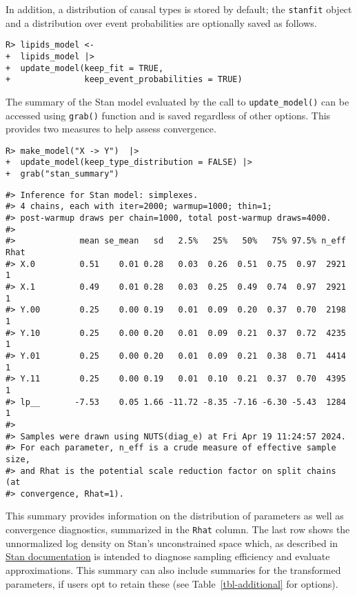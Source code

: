 \documentclass[
  11pt,
  article]{jss}
\begin{document}
In addition, a distribution of causal types is stored by default; the
\texttt{stanfit} object and a distribution over event probabilities are
optionally saved as follows.

\begin{verbatim}
R> lipids_model <- 
+  lipids_model |> 
+  update_model(keep_fit = TRUE,
+               keep_event_probabilities = TRUE)
\end{verbatim}

The summary of the Stan model evaluated by the call to
\texttt{update\_model()} can be accessed using \texttt{grab()} function
and is saved regardless of other options. This provides two measures to
help assess convergence.

\begin{verbatim}
R> make_model("X -> Y")  |> 
+  update_model(keep_type_distribution = FALSE) |>
+  grab("stan_summary") 
\end{verbatim}

\begin{verbatim}
#> Inference for Stan model: simplexes.
#> 4 chains, each with iter=2000; warmup=1000; thin=1; 
#> post-warmup draws per chain=1000, total post-warmup draws=4000.
#> 
#>             mean se_mean   sd   2.5%   25%   50%   75% 97.5% n_eff Rhat
#> X.0         0.51    0.01 0.28   0.03  0.26  0.51  0.75  0.97  2921    1
#> X.1         0.49    0.01 0.28   0.03  0.25  0.49  0.74  0.97  2921    1
#> Y.00        0.25    0.00 0.19   0.01  0.09  0.20  0.37  0.70  2198    1
#> Y.10        0.25    0.00 0.20   0.01  0.09  0.21  0.37  0.72  4235    1
#> Y.01        0.25    0.00 0.20   0.01  0.09  0.21  0.38  0.71  4414    1
#> Y.11        0.25    0.00 0.19   0.01  0.10  0.21  0.37  0.70  4395    1
#> lp__       -7.53    0.05 1.66 -11.72 -8.35 -7.16 -6.30 -5.43  1284    1
#> 
#> Samples were drawn using NUTS(diag_e) at Fri Apr 19 11:24:57 2024.
#> For each parameter, n_eff is a crude measure of effective sample size,
#> and Rhat is the potential scale reduction factor on split chains (at 
#> convergence, Rhat=1).
\end{verbatim}

This summary provides information on the distribution of parameters as
well as convergence diagnostics, summarized in the \texttt{Rhat} column.
The last row shows the unnormalized log density on Stan's unconstrained
space which, as described in
\href{https://mc-stan.org/cmdstanr/reference/fit-method-lp.html}{Stan
documentation} is intended to diagnose sampling efficiency and evaluate
approximations. This summary can also include summaries for the
transformed parameters, if users opt to retain these (see
Table~\ref{tbl-additional} for options).
\end{document}
